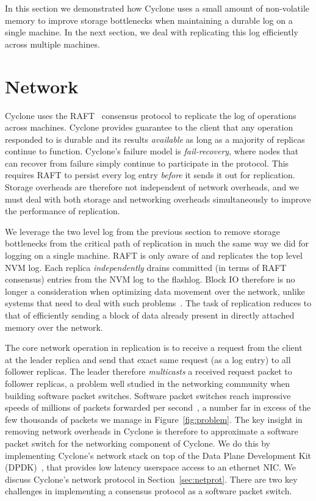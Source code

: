 \documentclass[pageno]{jpaper}
\begin{document}
In this section we demonstrated how Cyclone uses a small amount of non-volatile
memory to improve storage bottlenecks when maintaining a durable log on a single
machine. In the next section, we deal with replicating this log efficiently
across multiple machines.

\section{Network}
\label{sec:network}
Cyclone uses the RAFT~\cite{raft} consensus protocol to replicate the log of
operations across machines. Cyclone provides guarantee to the client that any
operation responded
to is durable and its results \emph{available} as long as a majority of replicas
continue to function. Cyclone's failure model is \emph{fail-recovery},
where nodes that can recover from failure simply continue to participate in
the protocol. This
requires RAFT to persist every log entry \emph{before} it sends it out for
replication. Storage overheads are therefore not independent of network
overheads, and we must deal with both storage and networking overheads
simultaneously to improve the performance of replication.

We leverage the two level log from the previous section to remove storage
bottlenecks from the critical path of replication in much the same way we did
for logging on a single machine. RAFT is only aware of and replicates the top
level NVM log. Each replica \emph{independently} drains committed (in terms of
RAFT consensus) entries from the NVM log to the flashlog. Block IO therefore is
no longer a consideration when optimizing data movement over the network, unlike
systems that need to deal with such problems~\cite{reflex}. The task of
replication reduces to that of efficiently sending a block of data already
present in directly attached memory over the network. 

The core network operation in replication is to receive a request from the
client at the leader replica and send that exact same request (as a log entry)
to all follower replicas. The leader therefore \emph{multicasts} a received
request packet to follower replicas, a problem well studied in the networking
community when building software packet switches. Software packet switches reach
impressive speeds of millions of packets forwarded per second~\cite{dpdk_perf}, 
a number far in excess of the few thousands of packets we manage in
Figure~\ref{fig:problem}. The key insight in removing network overheads in
Cyclone is therefore to approximate a software packet switch for the networking
component of Cyclone. We do this by implementing Cyclone's network stack on top
of the Data Plane Development Kit (DPDK)~\cite{dpdk}, that provides low latency
userspace access to an ethernet NIC. We discuss Cyclone's network protocol in
Section~\ref{sec:netprot}. There are two key challenges in implementing a
consensus protocol as a software packet switch.
\end{document}
